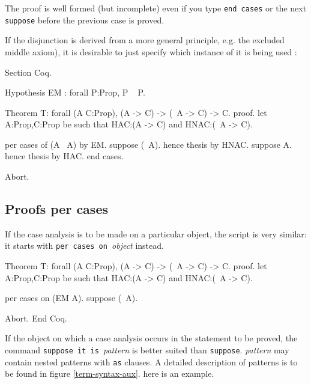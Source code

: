 The proof is well formed (but incomplete) even if you type {\tt end
 cases} or the next {\tt suppose} before the previous case is proved.

If the disjunction is derived from a more general principle, e.g. the
excluded middle axiom), it is desirable to just specify which instance
of it is being used :

\begin{coq_eval}
Section Coq.
\end{coq_eval}
\begin{coq_example}
Hypothesis EM : forall P:Prop, P \/ ~ P.
\end{coq_example} 
\begin{coq_eval}
Theorem T: forall (A C:Prop), (A -> C) -> (~A -> C) -> C.
proof.
let A:Prop,C:Prop be such that HAC:(A -> C) and HNAC:(~A -> C).
\end{coq_eval} 
\begin{coq_example}
per cases of (A \/ ~A) by EM.
suppose (~A).
  hence thesis by HNAC.
suppose A.
  hence thesis by HAC.
end cases.
\end{coq_example}
\begin{coq_eval}
Abort.
\end{coq_eval}

\subsection{Proofs per cases}

If the case analysis is to be made on a particular object, the script
is very similar: it starts with {\tt per cases on }\emph{object} instead.

\begin{coq_eval}
Theorem T: forall (A C:Prop), (A -> C) -> (~A -> C) -> C.
proof.
let A:Prop,C:Prop be such that HAC:(A -> C) and HNAC:(~A -> C).
\end{coq_eval} 
\begin{coq_example}
per cases on (EM A).
suppose (~A).
\end{coq_example}
\begin{coq_eval}
Abort.
End Coq.
\end{coq_eval}

If the object on which a case analysis occurs in the statement to be
proved, the command {\tt suppose it is }\emph{pattern} is better
suited than {\tt suppose}. \emph{pattern} may contain nested patterns
with {\tt as} clauses. A detailed description of patterns is to be
found in figure \ref{term-syntax-aux}. here is an example.

